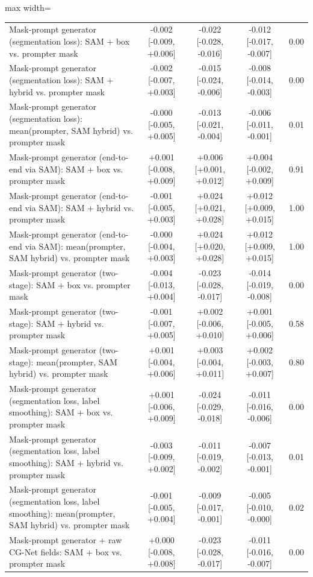 \begin{table}[htbp]
\begin{adjustbox}{max width=\linewidth}
\begin{tabular}{lcccc}
Mask-prompt generator (segmentation loss): SAM + box vs. prompter mask & -0.002 [-0.009, +0.006] & -0.022 [-0.028, -0.016] & -0.012 [-0.017, -0.007] & 0.00 \\
Mask-prompt generator (segmentation loss): SAM + hybrid vs. prompter mask & -0.002 [-0.007, +0.003] & -0.015 [-0.024, -0.006] & -0.008 [-0.014, -0.003] & 0.00 \\
Mask-prompt generator (segmentation loss): mean(prompter, SAM hybrid) vs. prompter mask & -0.000 [-0.005, +0.005] & -0.013 [-0.021, -0.004] & -0.006 [-0.011, -0.001] & 0.01 \\
Mask-prompt generator (end-to-end via SAM): SAM + box vs. prompter mask & +0.001 [-0.008, +0.009] & +0.006 [+0.001, +0.012] & +0.004 [-0.002, +0.009] & 0.91 \\
Mask-prompt generator (end-to-end via SAM): SAM + hybrid vs. prompter mask & -0.001 [-0.005, +0.003] & +0.024 [+0.021, +0.028] & +0.012 [+0.009, +0.015] & 1.00 \\
Mask-prompt generator (end-to-end via SAM): mean(prompter, SAM hybrid) vs. prompter mask & -0.000 [-0.004, +0.003] & +0.024 [+0.020, +0.028] & +0.012 [+0.009, +0.015] & 1.00 \\
Mask-prompt generator (two-stage): SAM + box vs. prompter mask & -0.004 [-0.013, +0.004] & -0.023 [-0.028, -0.017] & -0.014 [-0.019, -0.008] & 0.00 \\
Mask-prompt generator (two-stage): SAM + hybrid vs. prompter mask & -0.001 [-0.007, +0.005] & +0.002 [-0.006, +0.010] & +0.001 [-0.005, +0.006] & 0.58 \\
Mask-prompt generator (two-stage): mean(prompter, SAM hybrid) vs. prompter mask & +0.001 [-0.004, +0.006] & +0.003 [-0.004, +0.011] & +0.002 [-0.003, +0.007] & 0.80 \\
Mask-prompt generator (segmentation loss, label smoothing): SAM + box vs. prompter mask & +0.001 [-0.006, +0.009] & -0.024 [-0.029, -0.018] & -0.011 [-0.016, -0.006] & 0.00 \\
Mask-prompt generator (segmentation loss, label smoothing): SAM + hybrid vs. prompter mask & -0.003 [-0.009, +0.002] & -0.011 [-0.019, -0.002] & -0.007 [-0.013, -0.001] & 0.01 \\
Mask-prompt generator (segmentation loss, label smoothing): mean(prompter, SAM hybrid) vs. prompter mask & -0.001 [-0.005, +0.004] & -0.009 [-0.017, -0.001] & -0.005 [-0.010, -0.000] & 0.02 \\
Mask-prompt generator + raw CG-Net fields: SAM + box vs. prompter mask & +0.000 [-0.008, +0.008] & -0.023 [-0.028, -0.017] & -0.011 [-0.016, -0.007] & 0.00 \\

\end{tabular}
\end{adjustbox}
\end{table}
